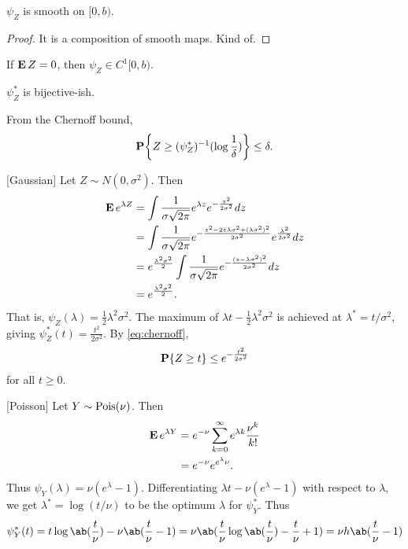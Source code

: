 \begin{proposition}
    $\psi_Z$ is smooth on $[0, b)$.
\end{proposition}
\begin{proof}
    It is a composition of smooth maps.
    Kind of. 
\end{proof}

\begin{proposition}
    If $\operatorname{\mathbf E} Z = 0$, then $\psi_Z \in C^1[0, b)$.
\end{proposition}

\begin{fact}
    $\psi_Z^*$ is bijective-ish.
\end{fact}
\begin{corollary}
    From the Chernoff bound, \[
        \P\set*{Z \ge (\psi_Z^*)^{-1}(\log \frac1{\delta})} \le \delta.
    \]
\end{corollary}

\begin{examples}
    \item{} [Gaussian] Let $Z \sim N(0, \sigma^2)$.
        Then \begin{align*}
            \operatorname{\mathbf E} e^{\lambda Z}
                &= \int \frac1{\sigma \sqrt{2\pi}} e^{\lambda z} e^{-\frac{z^2}{2 \sigma^2}} dz \\
                &= \int \frac1{\sigma \sqrt{2\pi}}
                    e^{-\frac{z^2 - 2 z \lambda \sigma^2 + (\lambda \sigma^2)^2}{2 \sigma^2}}
                    e^{\frac{\lambda^2}{2 \sigma^2}} dz \\
                &= e^{\frac{\lambda^2 \sigma^2}{2}}
                    \int \frac1{\sigma \sqrt{2\pi}}
                    e^{-\frac{(z - \lambda \sigma^2)^2}{2 \sigma^2}} dz \\
                &=  e^{\frac{\lambda^2 \sigma^2}{2}}.
        \end{align*}
        That is, $\psi_Z(\lambda) = \frac12 \lambda^2 \sigma^2$.
        The maximum of $\lambda t - \frac12 \lambda^2 \sigma^2$ is
        achieved at $\lambda^* = t / \sigma^2$,
        giving $\psi^*_Z(t) = \frac{t^2}{2 \sigma^2}$.
        By \cref{eq:chernoff}, \[
            \operatorname{\mathbf P}\{Z \ge t\} \le e^{-\frac{t^2}{2 \sigma^2}}
        \] for all $t \ge 0$.
    \item{} [Poisson] Let $Y \sim \operatorname{Pois}(\nu)$.
        Then \begin{align*}
            \operatorname{\mathbf E} e^{\lambda Y}
                &= e^{-\nu} \sum_{k=0}^\infty e^{\lambda k} \frac{\nu^k}{k!} \\
                &= e^{-\nu} e^{e^\lambda \nu}.
        \end{align*}
        Thus $\psi_Y(\lambda) = \nu (e^\lambda - 1)$.
        Differentiating $\lambda t - \nu (e^\lambda - 1)$ with respect to
        $\lambda$, we get $\lambda^* = \log(t / \nu)$ to be the optimum
        $\lambda$ for $\psi^*_Y$.
        Thus \[
            \psi^*_Y(t) = t \log\ab(\frac t\nu) - \nu \ab(\frac t\nu - 1)
                = \nu \ab(\frac t\nu \log\ab(\frac t\nu) - \frac t\nu + 1)
                = \nu h\ab(\frac t\nu - 1)
        \]
\end{examples}
